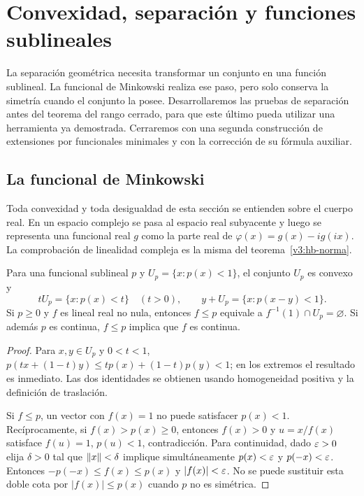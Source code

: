 \chapter{Convexidad, separación y funciones sublineales}\label{cap:v3-03}
La separación geométrica necesita transformar un conjunto en una función sublineal. La funcional de Minkowski realiza ese paso, pero solo conserva la simetría cuando el conjunto la posee. Desarrollaremos las pruebas de separación antes del teorema del rango cerrado, para que este último pueda utilizar una herramienta ya demostrada. Cerraremos con una segunda construcción de extensiones por funcionales minimales y con la corrección de su fórmula auxiliar.

\section{La funcional de Minkowski}\label{lec:v3-05}
Toda convexidad y toda desigualdad de esta sección se entienden sobre el cuerpo real. En un espacio complejo se pasa al espacio real subyacente y luego se representa una funcional real $g$ como la parte real de $\varphi(x)=g(x)-ig(ix)$. La comprobación de linealidad compleja es la misma del teorema~\ref{v3:hb-norma}.

\begin{proposicion}\label{v3:subnivel}
Para una funcional sublineal $p$ y $U_p=\{x:p(x)<1\}$, el conjunto $U_p$ es convexo y
\[
 tU_p=\{x:p(x)<t\}\quad(t>0),\qquad
 y+U_p=\{x:p(x-y)<1\}.
\]
Si $p\geq0$ y $f$ es lineal real no nula, entonces $f\leq p$ equivale a $f^{-1}(1)\cap U_p=\varnothing$. Si además $p$ es continua, $f\leq p$ implica que $f$ es continua.
\end{proposicion}
\begin{proof}
Para $x,y\in U_p$ y $0<t<1$, $p(tx+(1-t)y)\leq tp(x)+(1-t)p(y)<1$; en los extremos el resultado es inmediato. Las dos identidades se obtienen usando homogeneidad positiva y la definición de traslación.

Si $f\leq p$, un vector con $f(x)=1$ no puede satisfacer $p(x)<1$. Recíprocamente, si $f(x)>p(x)\geq0$, entonces $f(x)>0$ y $u=x/f(x)$ satisface $f(u)=1$, $p(u)<1$, contradicción. Para continuidad, dado $\varepsilon>0$ elija $\delta>0$ tal que $\left\lVert x\right\rVert<\delta$ implique simultáneamente $p(x)<\varepsilon$ y $p(-x)<\varepsilon$. Entonces $-p(-x)\leq f(x)\leq p(x)$ y $|f(x)|<\varepsilon$. No se puede sustituir esta doble cota por $|f(x)|\leq p(x)$ cuando $p$ no es simétrica.
\end{proof}

